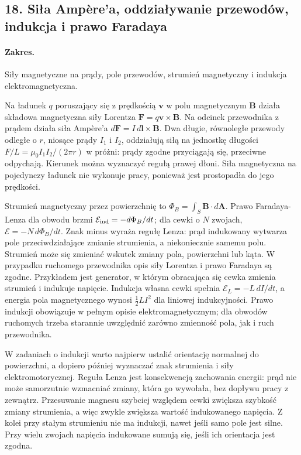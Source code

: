 \documentclass[11pt,a4paper]{article}
\begin{document}
\subsection{18. Siła Ampère’a, oddziaływanie przewodów, indukcja i prawo Faradaya}
\paragraph{Zakres.} Siły magnetyczne na prądy, pole przewodów, strumień magnetyczny i indukcja elektromagnetyczna.

Na ładunek $q$ poruszający się z prędkością $\mathbf v$ w polu magnetycznym $\mathbf B$ działa składowa magnetyczna siły Lorentza $\mathbf F=q\mathbf v\times\mathbf B$. Na odcinek przewodnika z prądem działa siła Ampère’a $d\mathbf F=I\,d\mathbf l\times\mathbf B$. Dwa długie, równoległe przewody odległe o $r$, niosące prądy $I_1$ i $I_2$, oddziałują siłą na jednostkę długości $F/L=\mu_0I_1I_2/(2\pi r)$ w próżni: prądy zgodne przyciągają się, przeciwne odpychają. Kierunek można wyznaczyć regułą prawej dłoni. Siła magnetyczna na pojedynczy ładunek nie wykonuje pracy, ponieważ jest prostopadła do jego prędkości.

Strumień magnetyczny przez powierzchnię to $\Phi_B=\int_S\mathbf B\cdot d\mathbf A$. Prawo Faradaya-Lenza dla obwodu brzmi $\mathcal E_{\rm ind}=-d\Phi_B/dt$; dla cewki o $N$ zwojach, $\mathcal E=-N\,d\Phi_B/dt$. Znak minus wyraża regułę Lenza: prąd indukowany wytwarza pole przeciwdziałające zmianie strumienia, a niekoniecznie samemu polu. Strumień może się zmieniać wskutek zmiany pola, powierzchni lub kąta. W przypadku ruchomego przewodnika opis siły Lorentza i prawo Faradaya są zgodne. Przykładem jest generator, w którym obracająca się cewka zmienia strumień i indukuje napięcie. Indukcja własna cewki spełnia $\mathcal E_L=-L\,dI/dt$, a energia pola magnetycznego wynosi $\tfrac12LI^2$ dla liniowej indukcyjności. Prawo indukcji obowiązuje w pełnym opisie elektromagnetycznym; dla obwodów ruchomych trzeba starannie uwzględnić zarówno zmienność pola, jak i ruch przewodnika.

W zadaniach o indukcji warto najpierw ustalić orientację normalnej do powierzchni, a dopiero później wyznaczać znak strumienia i siły elektromotorycznej. Reguła Lenza jest konsekwencją zachowania energii: prąd nie może samorzutnie wzmacniać zmiany, która go wywołała, bez dopływu pracy z zewnątrz. Przesuwanie magnesu szybciej względem cewki zwiększa szybkość zmiany strumienia, a więc zwykle zwiększa wartość indukowanego napięcia. Z kolei przy stałym strumieniu nie ma indukcji, nawet jeśli samo pole jest silne. Przy wielu zwojach napięcia indukowane sumują się, jeśli ich orientacja jest zgodna.
\end{document}
